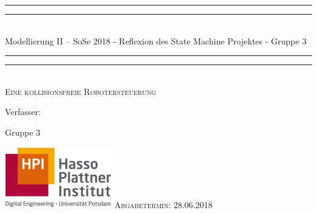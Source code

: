 \documentclass[11pt]{article}
\newlength{\drop}
\begin{document}
  \begin{titlepage}
    \textheight
    \centering
    \vspace*{\baselineskip}
    \rule{\textwidth}{1.6pt}\vspace*{-\baselineskip}\vspace*{2pt}
    \rule{\textwidth}{0.4pt}\\[\baselineskip]
    {\LARGE Modellierung II – SoSe 2018 - Reflexion des State Machine Projektes - Gruppe 3}\\[0.2\baselineskip]
    \rule{\textwidth}{0.4pt}\vspace*{-\baselineskip}\vspace{3.2pt}
    \rule{\textwidth}{1.6pt}\\[\baselineskip]
    \scshape
    Eine kollisionsfreie Robotersteuerung\par
    \vspace*{2\baselineskip}
    Verfasser: \\[\baselineskip]
    {\Large Gruppe 3\par}
    \centering
    \vspace{1cm}
    \includegraphics[width=0.25 \textwidth]{hpi.png}
    \vfill
    {\scshape Abgabetermin: 28.06.2018\\}
  \end{titlepage}
\end{document}
